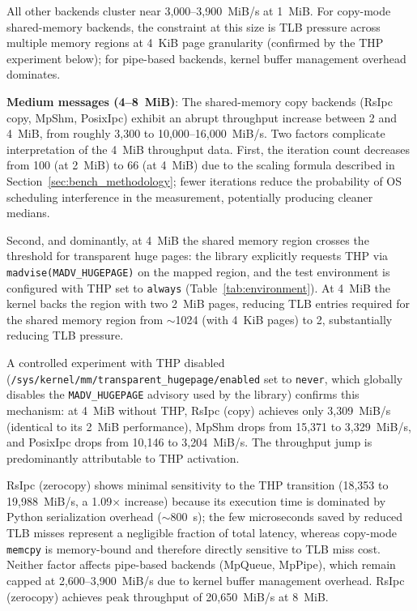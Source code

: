 All other backends cluster near 3,000--3,900~MiB/s at 1~MiB. For copy-mode shared-memory backends, the constraint at this size is TLB pressure across multiple memory regions at 4~KiB page granularity (confirmed by the THP experiment below); for pipe-based backends, kernel buffer management overhead dominates.

\textbf{Medium messages (4--8~MiB)}: The shared-memory copy backends (RsIpc copy, MpShm, PosixIpc) exhibit an abrupt throughput increase between 2 and 4~MiB, from roughly 3,300 to 10,000--16,000~MiB/s. Two factors complicate interpretation of the 4~MiB throughput data. First, the iteration count decreases from 100 (at 2~MiB) to 66 (at 4~MiB) due to the scaling formula described in Section~\ref{sec:bench_methodology}; fewer iterations reduce the probability of OS scheduling interference in the measurement, potentially producing cleaner medians.

\begin{sloppypar}
Second, and dominantly, at 4~MiB the shared memory region crosses the threshold for transparent huge pages: the library explicitly requests THP via \texttt{madvise(MADV\_HUGEPAGE)} on the mapped region, and the test environment is configured with THP set to \texttt{always} (Table~\ref{tab:environment}). At 4~MiB the kernel backs the region with two 2~MiB pages, reducing TLB entries required for the shared memory region from $\sim$1024 (with 4~KiB pages) to 2, substantially reducing TLB pressure.

A controlled experiment with THP disabled (\texttt{/sys/kernel/mm/transparent\_hugepage/enabled} set to \texttt{never}, which globally disables the \texttt{MADV\_HUGEPAGE} advisory used by the library) confirms this mechanism: at 4~MiB without THP, RsIpc (copy) achieves only 3{,}309~MiB/s (identical to its 2~MiB performance), MpShm drops from 15{,}371 to 3{,}329~MiB/s, and PosixIpc drops from 10{,}146 to 3{,}204~MiB/s. The throughput jump is predominantly attributable to THP activation.
\end{sloppypar}

RsIpc (zerocopy) shows minimal sensitivity to the THP transition (18,353 to 19,988~MiB/s, a 1.09$\times$ increase) because its execution time is dominated by Python serialization overhead ($\sim$800~\textmu s); the few microseconds saved by reduced TLB misses represent a negligible fraction of total latency, whereas copy-mode \texttt{memcpy} is memory-bound and therefore directly sensitive to TLB miss cost. Neither factor affects pipe-based backends (MpQueue, MpPipe), which remain capped at 2,600--3,900~MiB/s due to kernel buffer management overhead. RsIpc (zerocopy) achieves peak throughput of 20,650~MiB/s at 8~MiB.

